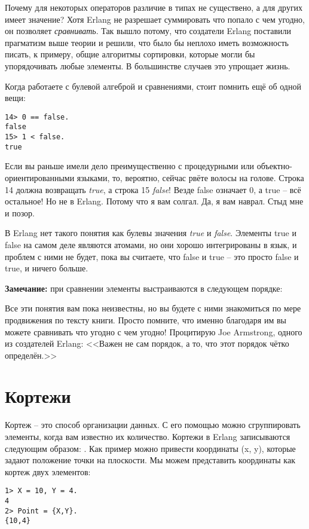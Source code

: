 Почему для некоторых операторов различие в типах не существено, а для других имеет значение?
Хотя Erlang не разрешает суммировать что попало с чем угодно, он позволяет \emph{сравнивать}.
Так вышло потому, что создатели Erlang поставили прагматизм выше теории и решили, что было бы неплохо иметь возможность писать, к примеру, общие алгоритмы сортировки, которые могли бы упорядочивать любые элементы.
В большинстве случаев это упрощает жизнь.

Когда работаете с булевой алгеброй и сравнениями, стоит помнить ещё об одной вещи:
\begin{lstlisting}[style=repl]
14> 0 == false.
false
15> 1 < false.
true
\end{lstlisting}

Если вы раньше имели дело преимущественно с процедурными или объектно\--ориентированными языками, то, вероятно, сейчас рвёте волосы на голове.
Строка 14 должна возвращать \emph{true}, а строка 15 \emph{false}!
Везде false означает 0, а true \--- всё остальное!
Но не в Erlang.
Потому что я вам солгал.
Да, я вам наврал.
Стыд мне и позор.

В Erlang нет такого понятия как булевы значения \emph{true} и \emph{false}.
Элементы true и false на самом деле являются атомами, но они хорошо интегрированы в язык, и проблем с ними не будет, пока вы считаете, что false и true \--- это просто false и true, и ничего больше.\\ 
\colorbox{lgray}
{
    \begin{minipage}{1.0\linewidth}
    \textbf{Замечание:} при сравнении элементы выстраиваются в следующем порядке:\\ 
    
    Все эти понятия вам пока неизвестны, но вы будете с ними знакомиться по мере продвижения по тексту книги.
    Просто помните, что именно благодаря им вы можете сравнивать что угодно с чем угодно!
    Процитирую Joe Armstrong, одного из создателей Erlang: <<Важен не сам порядок, а то, что этот порядок чётко определён.>>
    \end{minipage}
}
\section{Кортежи}
\label{tuples}
Кортеж \--- это способ организации данных.
С его помощью можно сгруппировать элементы, когда вам известно их количество.
Кортежи в Erlang записываются следующим образом: .
Как пример можно привести координаты (x, y), которые задают положение точки на плоскости.
Мы можем представить координаты как кортеж двух элементов:
\begin{lstlisting}[style=repl]
1> X = 10, Y = 4.
4
2> Point = {X,Y}.
{10,4}
\end{lstlisting}


